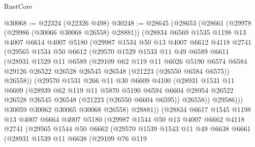 \begin{lexlean}{RustCore}
\begin{coremodule}
@30068 := @22324 (@22326 @498)
@30248 := @28645
    (@28653
      (@28661
        (@29978 (@29986 (@30066 @30068 @26558) @28881))
        (@28834
          @6569
          @1535
          @1198
          @13
          @4007
          @6614
          @4007
          @5180
          (@29987
            @1534
            @50
            @13
            @4007
            @6612
            @4118
            @2741
            (@29565
              @1534
              @50
              @6612
              (@29570
                @1529
                @1533
                @11
                @49
                @6589
                @6611
                (@28931
                  @1529
                  @11
                  @6589
                  (@29109
                    @62
                    @119
                    @11
                    @6026
                    @5190
                    @6574
                    @6584
                    @29126
                    @26522
                    @26528
                    @26545
                    @26548
                    (@21223 (@26550 @6584 @6575))
                    @26558))
                (@29570
                  @1531
                  @266
                  @11
                  @30
                  @6609
                  @4100
                  (@28931
                    @1531
                    @11
                    @6609
                    (@28939
                      @62
                      @119
                      @11
                      @5870
                      @5190
                      @6594
                      @6604
                      @28954
                      @26522
                      @26528
                      @26545
                      @26548
                      (@21223 (@26550 @6604 @6595))
                      @26558))
                  @29586)))
            @30059
            @30062
            @30065
            @30068
            @26558)
          @28881))
      (@28834
        @6617
        @1545
        @1198
        @13
        @4007
        @6664
        @4007
        @5180
        (@29987
          @1544
          @50
          @13
          @4007
          @6662
          @4118
          @2741
          (@29565
            @1544
            @50
            @6662
            (@29570
              @1539
              @1543
              @11
              @49
              @6638
              @6661
              (@28931
                @1539
                @11
                @6638
                (@29109
                  @76
                  @119

\end{coremodule}
\end{lexlean}
